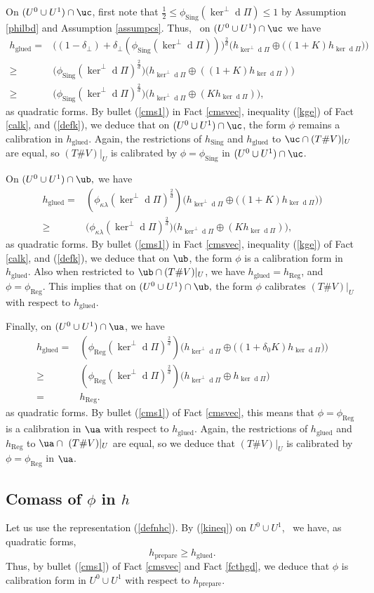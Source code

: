 \documentclass[11pt,a4paper]{amsart}
\numberwithin{equation}{section}
\newcommand{\hgd}{h_{\operatorname{glued}}}
\newcommand{\hpp}{h_{\operatorname{prepare}}}
\newcommand{\reg}{{\operatorname{Reg}}}
\newcommand{\sing}{{\operatorname{Sing}}}
\newcommand{\de}{\delta}
\newcommand{\lam}{\lambda}
\newcommand{\kn}{\ker^\perp \ed\Pi}
\newcommand{\ed}{{\operatorname{d}}}
\newcommand{\hkp}{h_{\ker \ed\Pi}}
\newcommand{\hkn}{h_{\ker^\perp \ed\Pi}}
\newcommand{\ka}{\kappa}
\newcommand{\tvu}{(T\#V)|_U}
\theoremstyle{plain}
\theoremstyle{definition}
\numberwithin{equation}{subsection}
\begin{document}
	On $(U^0\cup U^1)\cap {\uc}$, first note that $\frac{1}{2}\le\phi_\sing(\ker^\perp\ed\Pi)\le 1$ by Assumption \ref{philbd} and Assumption \ref{assumpcs}. Thus,  on $(U^0\cup U^1)\cap{\uc}$ we have
	\begin{align*}
		\hgd=&	\bigg((1-\de_\perp)+\de_\perp(\phi_\sing(\kn))\bigg)^{\frac{2}{d}}\Big(\hkn\oplus \big((1+K)\hkp\big)\Big)\\\ge& \big(\phi_\sing(\ker^\perp\ed\Pi)^{\frac{2}{d}}\big)\big(\hkn\oplus((1+K)\hkp)\big)\\
		\ge& \big(\phi_\sing(\ker^\perp\ed\Pi)^{\frac{2}{d}}\big)\big(\hkn\oplus(K\hkp)\big),
	\end{align*}as quadratic forms.
	By bullet (\ref{cms1}) in Fact \ref{cmsvec}, inequality (\ref{kge}) of Fact \ref{calk}, and (\ref{defk}), we deduce that on $(U^0\cup U^1)\cap{\uc}$, the form $\phi$ remains a calibration in $\hgd.$ Again, the restrictions of $h_\sing$ and $\hgd$ to $\uc\cap \tvu$ are equal, so $\tvu$ is calibrated by $\phi=\phi_\sing$ in $(U^0\cup U^1)\cap{\uc}$. 
	
	On $(U^0\cup U^1)\cap{\ub},$ we have
	\begin{align*}
		\hgd=&(\phi_{\ka\lam}(\kn)^{\frac{2}{d}})\Big(\hkn\oplus \big((1+K)\hkp\big)\Big)\\\ge& \big(\phi_{\ka\lam}(\ker^\perp\ed\Pi)^{\frac{2}{d}}\big)\big(\hkn\oplus(K\hkp)\big),
	\end{align*}as quadratic forms.
	By bullet (\ref{cms1}) in Fact \ref{cmsvec}, inequality (\ref{kge}) of Fact \ref{calk}, and (\ref{defk}), we deduce that on ${\ub}$, the form $\phi$ is a calibration form in $\hgd.$ Also when restricted to ${\ub}\cap \tvu$, we have $\hgd=h_\reg$, and $\phi=\phi_\reg$. This implies that on $(U^0\cup U^1)\cap{\ub},$ the form $\phi$ calibrates $\tvu$ with respect to $\hgd.$
	
	Finally, on $(U^0\cup U^1)\cap\ua$, we have \begin{align*}
		\hgd=&	(\phi_\reg(\kn)^{\frac{2}{d}})\Big(\hkn\oplus \big((1+\de_0 K)\hkp\big)\Big)\\\ge&(\phi_\reg(\kn)^{\frac{2}{d}})\big(\hkn\oplus\hkp\big)\\=& h_\reg.
	\end{align*} as quadratic forms. By bullet (\ref{cms1}) of Fact \ref{cmsvec}, this means that $\phi=\phi_\reg$ is a calibration in ${\ua}$ with respect to $\hgd.$ Again, the restrictions of $\hgd$ and $h_\reg$ to $\ua\cap  \tvu$ are equal, so we deduce that $\tvu$ is calibrated by $\phi=\phi_\reg$ in $\ua$.  
	\subsection{Comass of $\phi$ in $h$}
	Let us use the representation (\ref{defnhc}). By (\ref{kineq}) on $U^0\cup U^1$,  we have, as quadratic forms,
	$$\hpp\ge \hgd.$$
	Thus, by bullet (\ref{cms1}) of Fact \ref{cmsvec} and Fact \ref{fcthgd}, we deduce that $\phi$ is calibration form in $U^0\cup U^1$ with respect to $\hpp.$
	
\end{document}
